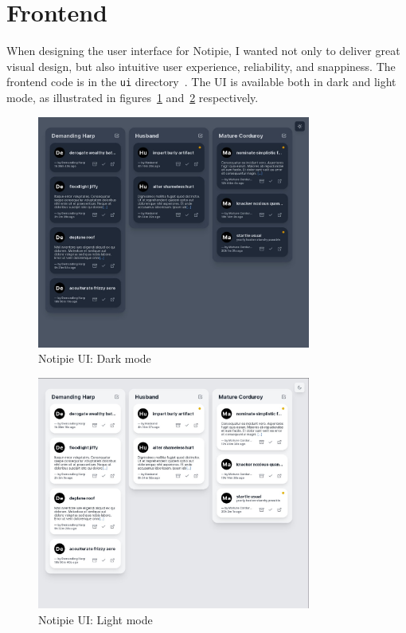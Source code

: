 \section{Frontend}\label{sec:frontend}

When designing the user interface for Notipie,
I wanted not only to deliver great visual design,
but also intuitive user experience,
reliability,
and snappiness.
The frontend code
is in the
\texttt{ui} directory~\cite{sewera_notipie_2022-5}.
The UI is available both in dark and light mode,
as illustrated in figures~\ref{fig:notipie-ui-dark}
and~\ref{fig:notipie-ui-light} respectively.

\begin{figure}[h]
  \centering
  \includegraphics[width=9cm,keepaspectratio]{img/notipie_dark.jpg}
  \caption{Notipie UI: Dark mode}
  \label{fig:notipie-ui-dark}
\end{figure}

\begin{figure}[h]
  \centering
  \includegraphics[width=9cm,keepaspectratio]{img/notipie_light.jpg}
  \caption{Notipie UI: Light mode}
  \label{fig:notipie-ui-light}
\end{figure}








